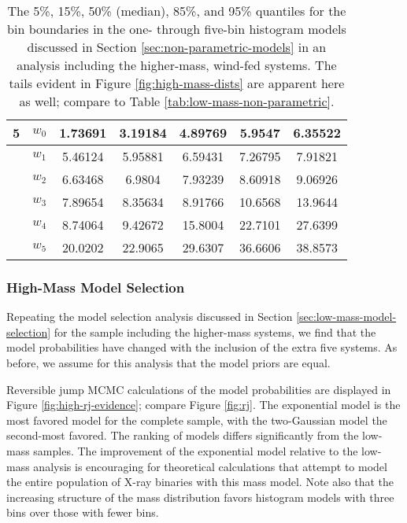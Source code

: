 \documentclass[preprint]{aastex}
\begin{document}
\begin{table}
\begin{center}
\begin{tabular}{|c|c|c|c|c|c|c|}
      \hline \hline
      5 & $w_0$ & 1.73691 & 3.19184 & 4.89769 & 5.9547 & 6.35522 \\
      \hline
      & $w_1$ & 5.46124 & 5.95881 & 6.59431 & 7.26795 & 7.91821 \\
      \hline
      & $w_2$ & 6.63468 & 6.9804 & 7.93239 & 8.60918 & 9.06926 \\
      \hline
      & $w_3$ & 7.89654 & 8.35634 & 8.91766 & 10.6568 & 13.9644 \\
      \hline
      & $w_4$ & 8.74064 & 9.42672 & 15.8004 & 22.7101 & 27.6399 \\
      \hline
      & $w_5$ & 20.0202 & 22.9065 & 29.6307 & 36.6606 & 38.8573 \\
      \hline
    \end{tabular}
  \end{center}
  \caption{\label{tab:high-mass-non-parametric} The 5\%, 15\%, 50\%
    (median), 85\%, and 95\% quantiles for the bin boundaries in the
    one- through five-bin histogram models discussed in Section
    \ref{sec:non-parametric-models} in an 
    analysis including the higher-mass, wind-fed systems.  
    The tails evident in Figure \ref{fig:high-mass-dists} are apparent
    here as well; compare to Table \ref{tab:low-mass-non-parametric}.}
\end{table}

\subsubsection{High-Mass Model Selection}
\label{sec:high-mass-model-selection}

Repeating the model selection analysis discussed in Section
\ref{sec:low-mass-model-selection} for the sample including the
higher-mass systems, we find that the model probabilities have changed
with the inclusion of the extra five systems.  As before, we assume
for this analysis that the model priors are equal.

Reversible jump MCMC calculations of the model probabilities are
displayed in Figure \ref{fig:high-rj-evidence}; compare Figure
\ref{fig:rj}.  The exponential model is the most favored model for the
complete sample, with the two-Gaussian model the second-most favored.
The ranking of models differs significantly from the low-mass
samples.  The improvement of the exponential model relative to the
low-mass analysis is encouraging for theoretical calculations that
attempt to model the entire population of X-ray binaries with this
mass model.  Note also that the increasing structure of the mass
distribution favors histogram models with three bins over those with
fewer bins.
\end{document}
